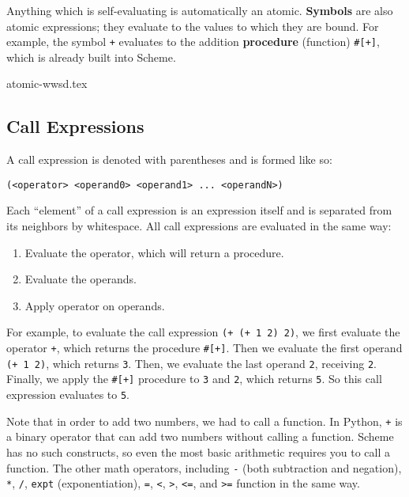 Anything which is self-evaluating is automatically an atomic.
\textbf{Symbols} are also atomic expressions; they evaluate to the values to which they are bound. For example, the symbol \lstinline{+} evaluates to the addition \textbf{procedure} (function) \lstinline{#[+]}, which is already built into Scheme. 

{atomic-wwsd.tex}


\subsection{Call Expressions}

A call expression is denoted with parentheses and is formed like so:
\vspace{0.5mm}
\begin{lstlisting}
(<operator> <operand0> <operand1> ... <operandN>)
\end{lstlisting}
Each ``element'' of a call expression is an expression itself and is separated from its neighbors by whitespace. All call expressions are evaluated in the same way:
\begin{enumerate}
\item Evaluate the operator, which will return a procedure.
\item Evaluate the operands.
\item Apply operator on operands.
\end{enumerate}
For example, to evaluate the call expression \lstinline{(+ (+ 1 2) 2)}, we first evaluate the operator \lstinline{+}, which returns the procedure \lstinline{#[+]}. Then we evaluate the first operand \lstinline{(+ 1 2)}, which returns \lstinline{3}. Then, we evaluate the last operand \lstinline{2}, receiving \lstinline{2}. Finally, we apply the \lstinline{#[+]} procedure to \lstinline{3} and \lstinline{2}, which returns \lstinline{5}. So this call expression evaluates to \lstinline{5}. 

Note that in order to add two numbers, we had to call a function. In Python, \lstinline{+} is a binary operator that can add two numbers without calling a function. Scheme has no such constructs, so even the most basic arithmetic requires you to call a function. The other math operators, including \lstinline{-} (both subtraction and negation), \lstinline{*}, \lstinline{/}, \lstinline{expt} (exponentiation), \lstinline{=}, \lstinline{<}, \lstinline{>}, \lstinline{<=}, and \lstinline{>=} function in the same way. 

